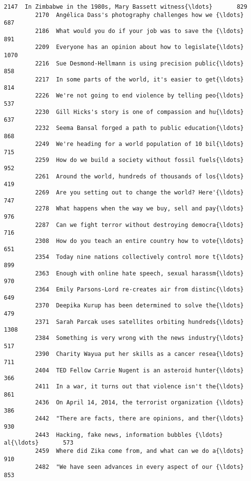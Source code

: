 \documentclass[11pt]{article}
\begin{document}
\begin{Verbatim}[commandchars=\\\{\}]
         2147  In Zimbabwe in the 1980s, Mary Bassett witness{\ldots}       829   
         2170  Angélica Dass's photography challenges how we {\ldots}       687   
         2186  What would you do if your job was to save the {\ldots}       891   
         2209  Everyone has an opinion about how to legislate{\ldots}      1070   
         2216  Sue Desmond-Hellmann is using precision public{\ldots}       858   
         2217  In some parts of the world, it's easier to get{\ldots}       814   
         2226  We're not going to end violence by telling peo{\ldots}       537   
         2230  Gill Hicks's story is one of compassion and hu{\ldots}       637   
         2232  Seema Bansal forged a path to public education{\ldots}       868   
         2249  We're heading for a world population of 10 bil{\ldots}       715   
         2259  How do we build a society without fossil fuels{\ldots}       952   
         2261  Around the world, hundreds of thousands of los{\ldots}       419   
         2269  Are you setting out to change the world? Here'{\ldots}       747   
         2278  What happens when the way we buy, sell and pay{\ldots}       976   
         2287  Can we fight terror without destroying democra{\ldots}       716   
         2308  How do you teach an entire country how to vote{\ldots}       651   
         2354  Today nine nations collectively control more t{\ldots}       899   
         2363  Enough with online hate speech, sexual harassm{\ldots}       970   
         2364  Emily Parsons-Lord re-creates air from distinc{\ldots}       649   
         2370  Deepika Kurup has been determined to solve the{\ldots}       479   
         2371  Sarah Parcak uses satellites orbiting hundreds{\ldots}      1308   
         2384  Something is very wrong with the news industry{\ldots}       517   
         2390  Charity Wayua put her skills as a cancer resea{\ldots}       711   
         2404  TED Fellow Carrie Nugent is an asteroid hunter{\ldots}       366   
         2411  In a war, it turns out that violence isn't the{\ldots}       861   
         2436  On April 14, 2014, the terrorist organization {\ldots}       386   
         2442  "There are facts, there are opinions, and ther{\ldots}       930   
         2443  Hacking, fake news, information bubbles {\ldots} al{\ldots}       573   
         2459  Where did Zika come from, and what can we do a{\ldots}       910   
         2482  "We have seen advances in every aspect of our {\ldots}       853   
         

\end{Verbatim}
\end{document}
